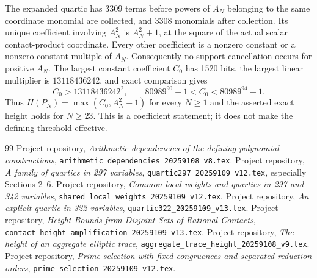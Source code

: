 \documentclass[11pt,a4paper]{article}
\begin{document}
The expanded quartic has 3309 terms before powers of $A_N$ belonging
to the same coordinate monomial are collected, and 3308 monomials
after collection. Its unique coefficient involving $A_N^2$ is
$A_N^2+1$, at the square of the actual scalar contact-product coordinate.
Every other coefficient is a nonzero constant or a nonzero constant
multiple of $A_N$. Consequently no support cancellation occurs for
positive $A_N$. The largest constant coefficient $C_0$ has 1520 bits,
the largest linear multiplier is $13118436242$, and exact comparison
gives
\[
 C_0>13118436242^2,\qquad
 80989^{90}+1<C_0<80989^{94}+1.
\]
Thus $H(P_N)=\max(C_0,A_N^2+1)$ for every $N\ge1$ and the asserted
exact height holds for $N\ge23$. This is a coefficient statement;
it does not make the defining threshold effective.

\begin{thebibliography}{99}\small\setlength{\itemsep}{2pt}
 Project repository,
\emph{Arithmetic dependencies of the defining-polynomial constructions},
\nolinkurl{arithmetic_dependencies_20259108_v8.tex}.
 Project repository,
\emph{A family of quartics in 297 variables},
\nolinkurl{quartic297_20259109_v12.tex}, especially Sections 2--6.
 Project repository,
\emph{Common local weights and quartics in 297 and 342 variables},
\nolinkurl{shared_local_weights_20259109_v12.tex}.
 Project repository,
\emph{An explicit quartic in 322 variables},
\nolinkurl{quartic322_20259109_v13.tex}.
 Project repository,
\emph{Height Bounds from Disjoint Sets of Rational Contacts},
\nolinkurl{contact_height_amplification_20259109_v13.tex}.
 Project repository,
\emph{The height of an aggregate elliptic trace},
\nolinkurl{aggregate_trace_height_20259108_v9.tex}.
 Project repository,
\emph{Prime selection with fixed congruences and separated reduction orders},
\nolinkurl{prime_selection_20259109_v12.tex}.
\end{thebibliography}
\end{document}
